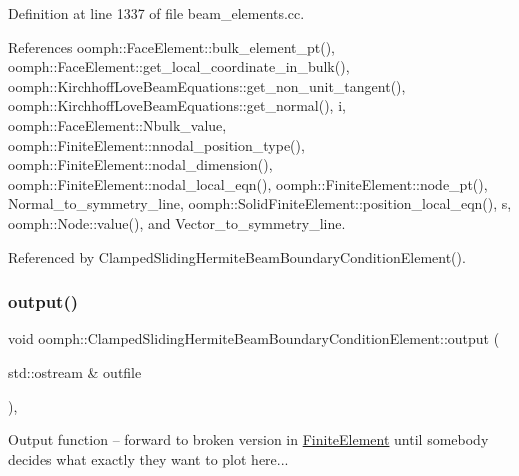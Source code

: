 Definition at line 1337 of file beam\+\_\+elements.\+cc.



References oomph\+::\+Face\+Element\+::bulk\+\_\+element\+\_\+pt(), oomph\+::\+Face\+Element\+::get\+\_\+local\+\_\+coordinate\+\_\+in\+\_\+bulk(), oomph\+::\+Kirchhoff\+Love\+Beam\+Equations\+::get\+\_\+non\+\_\+unit\+\_\+tangent(), oomph\+::\+Kirchhoff\+Love\+Beam\+Equations\+::get\+\_\+normal(), i, oomph\+::\+Face\+Element\+::\+Nbulk\+\_\+value, oomph\+::\+Finite\+Element\+::nnodal\+\_\+position\+\_\+type(), oomph\+::\+Finite\+Element\+::nodal\+\_\+dimension(), oomph\+::\+Finite\+Element\+::nodal\+\_\+local\+\_\+eqn(), oomph\+::\+Finite\+Element\+::node\+\_\+pt(), Normal\+\_\+to\+\_\+symmetry\+\_\+line, oomph\+::\+Solid\+Finite\+Element\+::position\+\_\+local\+\_\+eqn(), s, oomph\+::\+Node\+::value(), and Vector\+\_\+to\+\_\+symmetry\+\_\+line.



Referenced by Clamped\+Sliding\+Hermite\+Beam\+Boundary\+Condition\+Element().

\mbox{\label{classoomph_1_1ClampedSlidingHermiteBeamBoundaryConditionElement_aa4399941fd93727cbb8a2bbb00355fb1}} 
\subsubsection{\texorpdfstring{output()}{output()}\hspace{0.1cm}{\footnotesize\ttfamily [1/4]}}
{\footnotesize\ttfamily void oomph\+::\+Clamped\+Sliding\+Hermite\+Beam\+Boundary\+Condition\+Element\+::output (\begin{DoxyParamCaption}\item[{std\+::ostream \&}]{outfile }\end{DoxyParamCaption})\hspace{0.3cm}{\ttfamily [inline]}, {\ttfamily [virtual]}}

Output function -- forward to broken version in \hyperlink{classoomph_1_1FiniteElement}{Finite\+Element} until somebody decides what exactly they want to plot here... 

